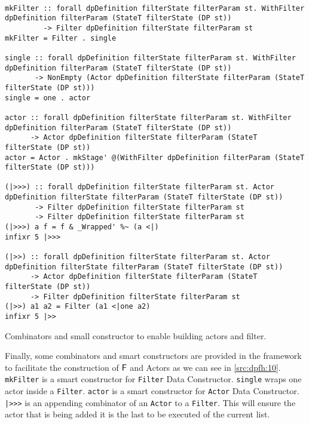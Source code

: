 \begin{listing}[htp!]
  \begin{verbatim}

mkFilter :: forall dpDefinition filterState filterParam st. WithFilter dpDefinition filterParam (StateT filterState (DP st)) 
         -> Filter dpDefinition filterState filterParam st
mkFilter = Filter . single

single :: forall dpDefinition filterState filterParam st. WithFilter dpDefinition filterParam (StateT filterState (DP st)) 
       -> NonEmpty (Actor dpDefinition filterState filterParam (StateT filterState (DP st)))
single = one . actor

actor :: forall dpDefinition filterState filterParam st. WithFilter dpDefinition filterParam (StateT filterState (DP st)) 
      -> Actor dpDefinition filterState filterParam (StateT filterState (DP st))
actor = Actor . mkStage' @(WithFilter dpDefinition filterParam (StateT filterState (DP st)))

(|>>>) :: forall dpDefinition filterState filterParam st. Actor dpDefinition filterState filterParam (StateT filterState (DP st)) 
       -> Filter dpDefinition filterState filterParam st 
       -> Filter dpDefinition filterState filterParam st
(|>>>) a f = f & _Wrapped' %~ (a <|)
infixr 5 |>>>

(|>>) :: forall dpDefinition filterState filterParam st. Actor dpDefinition filterState filterParam (StateT filterState (DP st)) 
      -> Actor dpDefinition filterState filterParam (StateT filterState (DP st)) 
      -> Filter dpDefinition filterState filterParam st
(|>>) a1 a2 = Filter (a1 <|one a2)
infixr 5 |>>
  \end{verbatim}
  \caption[{[\texttt{Stage.hs}] Filter / Actor smart constructors and combinators}]{Combinators and small constructor to enable building actors and filter.}
  \label{src:dpfh:10}
\end{listing}

Finally, some combinators and smart constructors are provided in the framework to facilitate the construction of $\mathsf{F}$ and Actors as we can see in \autoref{src:dpfh:10}.
\texttt{mkFilter} is a smart constructor for \texttt{Filter} Data Constructor. \texttt{single} wraps one actor inside a \texttt{Filter}.
\texttt{actor} is a smart constructor for \texttt{Actor} Data Constructor. \texttt{|>>>} is an appending combinator of an \texttt{Actor} to a \texttt{Filter}. 
This will ensure the actor that is being added it is the last to be executed of the current list.


